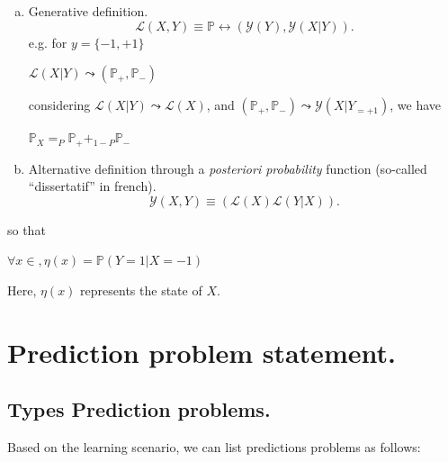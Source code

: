 			\begin{enumerate}[a)] %
				\item Generative definition.
					\begin{equation}
						\mathcal{L}(X,Y) \equiv \mathbb{P} \leftrightarrow (\mathcal{Y}(Y), \mathcal{Y}(X|Y)).
						\label{p_generative_law_example}
					\end{equation}
				e.g. for $y=\{-1,+1\}$\\ 
				\centerline{$\mathcal{L}(X|Y) \leadsto (\mathbb{P}_{+},\mathbb{P}_{-})$}

				considering $\mathcal{L}(X|Y) \leadsto \mathcal{L}(X)$, and $(\mathbb{P}_{+},\mathbb{P}_{-}) \leadsto \mathcal{Y}(X|Y_{=+1})$, we have\\ 
				\centerline{$\mathbb{P}_X = _{P}\mathbb{P}_{+} + _{1-P}\mathbb{P}_{-}$}


				\item Alternative definition through a \emph{posteriori probability} function \cite{tc_Lugosi} (so-called ``dissertatif'' in french).
					\begin{equation}
						\mathcal{Y}(X,Y) \equiv (\mathcal{L}(X)\mathcal{L}(Y|X)).
						\label{p_generative_law_example}
					\end{equation}
			\end{enumerate}
			so that\\
			\centerline{$\forall x \in, \eta(x)=\mathbb{P}(Y=1|X=-1)$}
			Here, $\eta(x)$ represents the state of $X$.
		


	\section{Prediction problem statement.}
		
		\subsection{Types Prediction problems.}
			Based on the learning scenario, we can list predictions problems as follows:
	
